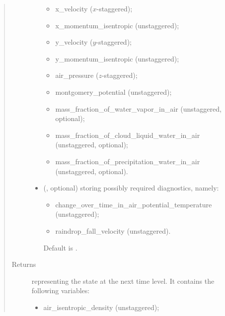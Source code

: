 \documentclass[letterpaper,10pt,english]{sphinxmanual}
\begin{document}
\begin{fulllineitems}
\begin{fulllineitems}
\begin{quote}
\begin{description}
\begin{itemize}
\begin{itemize}
\item {} 
x\_velocity (\(x\)-staggered);

\item {} 
x\_momentum\_isentropic (unstaggered);

\item {} 
y\_velocity (\(y\)-staggered);

\item {} 
y\_momentum\_isentropic (unstaggered);

\item {} 
air\_pressure (\(z\)-staggered);

\item {} 
montgomery\_potential (unstaggered);

\item {} 
mass\_fraction\_of\_water\_vapor\_in\_air (unstaggered, optional);

\item {} 
mass\_fraction\_of\_cloud\_liquid\_water\_in\_air (unstaggered, optional);

\item {} 
mass\_fraction\_of\_precipitation\_water\_in\_air (unstaggered, optional).

\end{itemize}


\item {} 
 (, optional) \textendash{} 
{\hyperref[\detokenize{api:storages.grid_data.GridData}]{}} storing possibly required diagnostics, namely:
\begin{itemize}
\item {} 
change\_over\_time\_in\_air\_potential\_temperature (unstaggered);

\item {} 
raindrop\_fall\_velocity (unstaggered).

\end{itemize}

Default is .


\end{itemize}

\item[{Returns}] \leavevmode

{\hyperref[\detokenize{api:storages.state_isentropic.StateIsentropic}]{}} representing the state at the next time level.
It contains the following variables:
\begin{itemize}
\item {} 
air\_isentropic\_density (unstaggered);


\end{itemize}
\end{description}
\end{quote}
\end{fulllineitems}
\end{fulllineitems}
\end{document}
